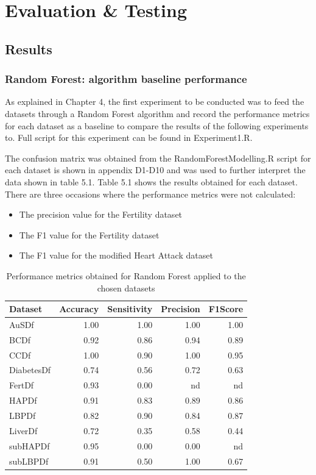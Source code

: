 \chapter{Evaluation \& Testing}\label{ch:Evaluation}
\section{Results}
\subsection{Random Forest: algorithm baseline performance}
As explained in Chapter 4, the first experiment to be conducted was to feed the datasets through  a Random Forest algorithm and record the performance metrics for each dataset as a baseline to compare the results of the following experiments to. Full script for this experiment can be found in Experiment1.R.

The confusion matrix was obtained from the RandomForestModelling.R script for each dataset is shown in appendix D1-D10 and was used to further interpret the data shown in table 5.1.\newline
Table 5.1 shows the results obtained for each dataset. There are three occasions where the performance metrics were not calculated:
\begin{itemize}
    \item The precision value for the Fertility dataset
    \item The F1 value for the Fertility dataset
    \item The F1 value for the modified Heart Attack dataset
\end{itemize}

\begin{table}[!htbp]
\centering
\begin{tabular}{lrrrr}
  \hline
  \rowcolor{LightCyan}
Dataset & Accuracy & Sensitivity & Precision & F1Score \\ 
  \hline
AuSDf & 1.00 & 1.00 & 1.00 & 1.00 \\ 
  BCDf & 0.92 & 0.86 & 0.94 & 0.89 \\ 
  CCDf & 1.00 & 0.90 & 1.00 & 0.95 \\ 
  DiabetesDf & 0.74 & 0.56 & 0.72 & 0.63 \\ 
  FertDf & 0.93 & 0.00 & nd & nd \\ 
  HAPDf & 0.91 & 0.83 & 0.89 & 0.86 \\ 
  LBPDf & 0.82 & 0.90 & 0.84 & 0.87 \\ 
  LiverDf & 0.72 & 0.35 & 0.58 & 0.44 \\ 
  subHAPDf & 0.95 & 0.00 & 0.00 & nd \\ 
  subLBPDf & 0.91 & 0.50 & 1.00 & 0.67 \\ 
   \hline
\end{tabular}
\caption{Performance metrics obtained for Random Forest applied to the chosen datasets}
\end{table}

